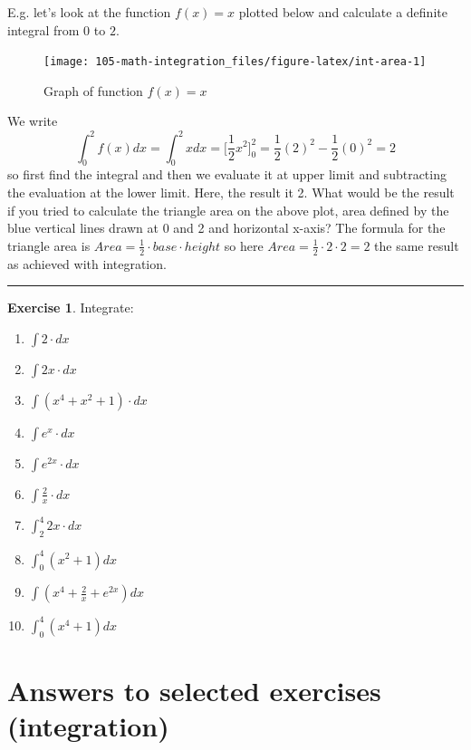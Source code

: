 \documentclass[
]{book}
\providecommand{\tightlist}{%
  \setlength{\itemsep}{0pt}\setlength{\parskip}{0pt}}
\theoremstyle{definition}
\theoremstyle{definition}
\theoremstyle{definition}
\newtheorem{exercise}{Exercise}[chapter]
\theoremstyle{remark}
\begin{document}
E.g. let's look at the function \(f(x) = x\) plotted below and calculate a definite integral from \(0\) to \(2\).

\begin{figure}

{\centering \texttt{[image: 105-math-integration\_files/figure-latex/int-area-1]} 

}

\caption{Graph of function $f(x) = x$}\label{fig:int-area}
\end{figure}

We write \[\int_{0}^2f(x)dx = \int_{0}^2 xdx =  \Bigr[ \frac{1}{2}x^2\Bigr]_0^2 = \frac{1}{2}(2)^2 - \frac{1}{2}(0)^2 = 2\] so first find the integral and then we evaluate it at upper limit and subtracting the evaluation at the lower limit. Here, the result it 2. What would be the result if you tried to calculate the triangle area on the above plot, area defined by the blue vertical lines drawn at 0 and 2 and horizontal x-axis? The formula for the triangle area is \(Area = \frac{1}{2}\cdot base \cdot height\) so here \(Area = \frac{1}{2} \cdot 2 \cdot 2 = 2\) the same result as achieved with integration.

\begin{center}\rule{0.5\linewidth}{0.5pt}\end{center}

\begin{exercise}
\protect\hypertarget{exr:m-int}{}{\label{exr:m-int} }
Integrate:

\begin{enumerate}
\def\labelenumi{\alph{enumi})}
\tightlist
\item
  \(\int 2 \cdot dx\)
\item
  \(\int 2x\cdot dx\)
\item
  \(\int (x^4 + x^2 + 1)\cdot dx\)
\item
  \(\int e^x\cdot dx\)
\item
  \(\int e^{2x}\cdot dx\)
\item
  \(\int \frac{2}{x}\cdot dx\)
\item
  \(\int_2^4 2x\cdot dx\)
\item
  \(\int_0^4 (x^2+1)dx\)
\item
  \(\int (x^4 + \frac{2}{x} + e^{2x}) dx\)
\item
  \(\int_0^4 (x^4+1) dx\)
\end{enumerate}
\end{exercise}

\hypertarget{answers-to-selected-exercises-integration}{%
\section*{Answers to selected exercises (integration)}\label{answers-to-selected-exercises-integration}}
\end{document}
